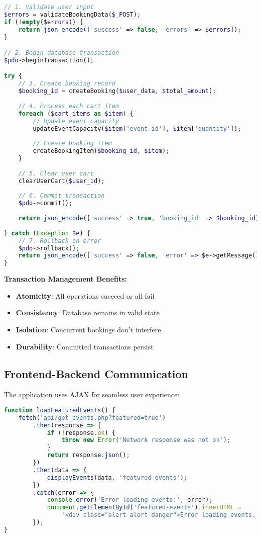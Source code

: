 \documentclass[12pt,a4paper]{article}
\begin{document}
\begin{lstlisting}[language=php, caption=Order Processing Logic (Simplified)]
// 1. Validate user input
$errors = validateBookingData($_POST);
if (!empty($errors)) {
    return json_encode(['success' => false, 'errors' => $errors]);
}

// 2. Begin database transaction
$pdo->beginTransaction();

try {
    // 3. Create booking record
    $booking_id = createBooking($user_data, $total_amount);
    
    // 4. Process each cart item
    foreach ($cart_items as $item) {
        // Update event capacity
        updateEventCapacity($item['event_id'], $item['quantity']);
        
        // Create booking item
        createBookingItem($booking_id, $item);
    }
    
    // 5. Clear user cart
    clearUserCart($user_id);
    
    // 6. Commit transaction
    $pdo->commit();
    
    return json_encode(['success' => true, 'booking_id' => $booking_id]);
    
} catch (Exception $e) {
    // 7. Rollback on error
    $pdo->rollback();
    return json_encode(['success' => false, 'error' => $e->getMessage()]);
}
\end{lstlisting}

\textbf{Transaction Management Benefits:}
\begin{itemize}
    \item \textbf{Atomicity}: All operations succeed or all fail
    \item \textbf{Consistency}: Database remains in valid state
    \item \textbf{Isolation}: Concurrent bookings don't interfere
    \item \textbf{Durability}: Committed transactions persist
\end{itemize}

\subsection{Frontend-Backend Communication}

The application uses AJAX for seamless user experience:

\begin{lstlisting}[language=javascript, caption=AJAX Event Loading]
function loadFeaturedEvents() {
    fetch('api/get_events.php?featured=true')
        .then(response => {
            if (!response.ok) {
                throw new Error('Network response was not ok');
            }
            return response.json();
        })
        .then(data => {
            displayEvents(data, 'featured-events');
        })
        .catch(error => {
            console.error('Error loading events:', error);
            document.getElementById('featured-events').innerHTML = 
                '<div class="alert alert-danger">Error loading events. Please try again.</div>';
        });
}
\end{lstlisting}
\end{document}
